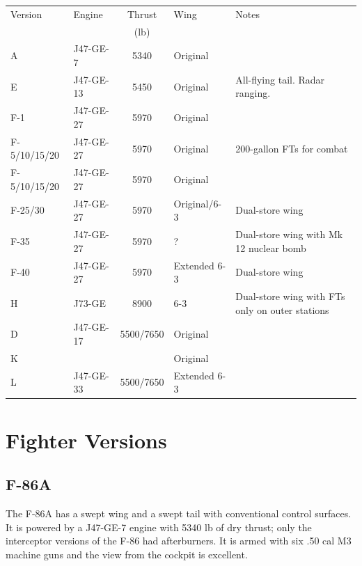 {    \begin{center}
        \scriptsize
        \begin{tabularx}{\linewidth}{llclL}
            \toprule
            Version&Engine&Thrust&Wing&Notes\\
            &&(lb)\\
            \midrule
            A&J47-GE-7 &5340&Original\\
            E&J47-GE-13 &5450&Original& All-flying tail. Radar ranging.\\
            F-1&J47-GE-27 &5970&Original\\
            F-5/10/15/20&J47-GE-27 &5970&Original&200-gallon FTs for combat\\
            F-5/10/15/20&J47-GE-27 &5970&Original&\\
            F-25/30&J47-GE-27 &5970&Original/6-3&Dual-store wing\\
            F-35&J47-GE-27 &5970&?&Dual-store wing with Mk 12 nuclear bomb\\
            F-40&J47-GE-27 &5970&Extended 6-3&Dual-store wing\\
            H&J73-GE &8900&6-3&Dual-store wing with FTs only on outer stations\\
            \midrule
            D&J47-GE-17 &5500/7650&Original\\
            K&&&Original\\
            L&J47-GE-33 &5500/7650&Extended 6-3\\
            \bottomrule
        \end{tabularx}
    \end{center}
}

\section{Fighter Versions}

\subsection{F-86A}

The F-86A has a swept wing and a swept tail with conventional control surfaces. It is powered by a J47-GE-7 engine with 5340 lb of dry thrust; only the interceptor versions of the F-86 had afterburners. It is armed with six .50 cal M3 machine guns and the view from the cockpit is excellent.%

